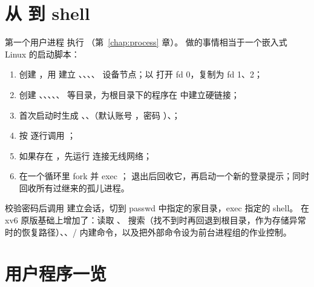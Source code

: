 \section{从  到 shell}

第一个用户进程  执行 （第~\ref{chap:process} 章）。 做的事情相当于一个嵌入式 Linux 的启动脚本：

\begin{enumerate}
  \item 创建 ，用  建立 、、、、 设备节点；以  打开 fd 0，复制为 fd 1、2；
  \item 创建 、、、、、 等目录，为根目录下的程序在  中建立硬链接；
  \item 首次启动时生成 、、（默认账号 ，密码 ）、；
  \item 按  逐行调用 ；
  \item 如果存在 ，先运行  连接无线网络；
  \item 在一个循环里 fork 并 exec ； 退出后回收它，再启动一个新的登录提示；同时回收所有过继来的孤儿进程。
\end{enumerate}

 校验密码后调用  建立会话，切到 passwd 中指定的家目录，exec 指定的 shell。 在 xv6 原版基础上增加了：读取 、 搜索（找不到时再回退到根目录，作为存储异常时的恢复路径）、、/ 内建命令，以及把外部命令设为前台进程组的作业控制。

\section{用户程序一览}

